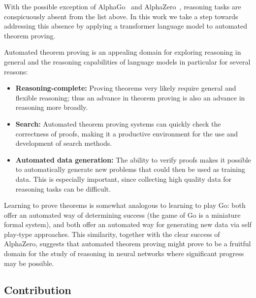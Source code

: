With the possible exception of AlphaGo~\cite{silver2016mastering} and AlphaZero~\cite{silver2017mastering}, reasoning tasks are conspicuously absent from the list above. In this work we take a step towards addressing this absence by applying a transformer language model to automated theorem proving.

Automated theorem proving \cite{harrison2014history} is an appealing domain for exploring reasoning in general and the reasoning capabilities of language models in particular for several reasons:

\begin{itemize}
    \item {\bf Reasoning-complete:} Proving theorems very likely require general and flexible reasoning;  thus an advance in theorem proving is also an advance in reasoning more broadly.
    \item {\bf Search:} Automated theorem proving systems can quickly check the correctness of proofs, making it a productive environment for the use and development of search methods. 
    \item {\bf Automated data generation:} The ability to verify proofs makes it possible to automatically generate new problems that could then be used as training data. This is especially important, since collecting high quality data for reasoning tasks can be difficult.
\end{itemize}

Learning to prove theorems is somewhat analogous to learning to play Go:  both offer an automated way of determining success (the game of Go is a miniature formal system), and both offer an automated way for generating new data via self play-type approaches.  This similarity, together with the clear success of AlphaZero, suggests that automated theorem proving might prove to be a fruitful domain for the study of reasoning in neural networks where significant progress may be possible.

\subsection{Contribution}

